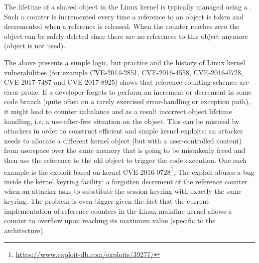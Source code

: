 The lifetime of a shared object in the Linux kernel is typically managed using a . 
Such a counter is incremented every time a reference to an object is taken and decremented when a reference is released. 
When the counter reaches zero the object can be safely deleted since there are no references to this object anymore (object is not used).

The above presents a simple logic, but practice and the history of Linux kernel vulnerabilities (for example CVE-2014-2851, CVE-2016-4558, CVE-2016-0728, CVE-2017-7487 and CVE-2017-8925) shows that reference counting schemes are error prone. If a developer forgets to perform an increment or decrement in some code branch (quite often on a rarely exercised error-handling or exception path), it might lead to counter imbalance and as a result incorrect object lifetime handling, i.e. a use-after-free situation on the object. This can be misused by attackers in order to construct efficient and simple kernel exploits: an attacker needs to allocate a different kernel object (but with a user-controlled content) from userspace over the same memory that is going to be mistakenly freed and then use the reference to the old object to trigger the code execution. One such example is the exploit based on kernel CVE-2016-0728\footnote{\url{https://www.exploit-db.com/exploits/39277/}}. The exploit abuses a bug inside the kernel keyring facility: a forgotten decrement of the reference counter when an attacker asks to substitute the session keyring with exactly the same keyring. 
The problem is even bigger given the fact that the current implementation of reference counters in the Linux mainline kernel allows a counter to overflow upon reaching its maximum value (specific to the architecture). 

